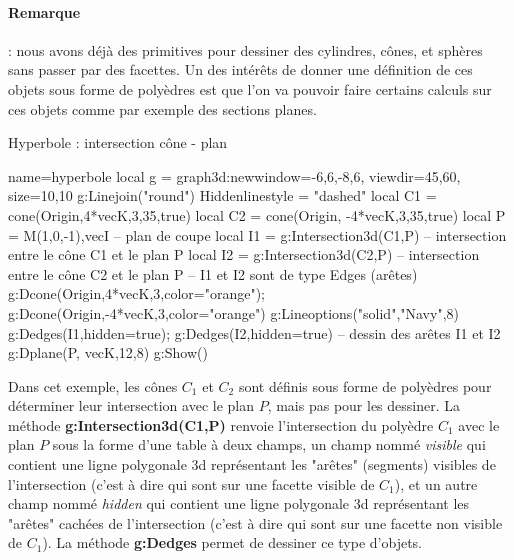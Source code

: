 \paragraph{Remarque} : nous avons déjà des primitives pour dessiner des cylindres, cônes, et sphères sans passer par des facettes. Un des intérêts de donner une définition de ces objets sous forme de polyèdres est que l'on va pouvoir faire certains calculs sur ces objets comme par exemple des sections planes.

\begin{demo}{Hyperbole : intersection cône - plan}
\begin{luadraw}{name=hyperbole}
local g = graph3d:new{window={-6,6,-8,6}, viewdir={45,60}, size={10,10}}
g:Linejoin("round")
Hiddenlinestyle = "dashed"
local C1 = cone(Origin,4*vecK,3,35,true)
local C2 = cone(Origin, -4*vecK,3,35,true)
local P = {M(1,0,-1),vecI} -- plan de coupe
local I1 = g:Intersection3d(C1,P) -- intersection entre le cône C1 et le plan P
local I2 = g:Intersection3d(C2,P) -- intersection entre le cône C2 et le plan P
-- I1 et I2 sont de type Edges (arêtes)
g:Dcone(Origin,4*vecK,3,{color="orange"}); g:Dcone(Origin,-4*vecK,3,{color="orange"})
g:Lineoptions("solid","Navy",8)
g:Dedges(I1,{hidden=true}); g:Dedges(I2,{hidden=true}) -- dessin des arêtes I1 et I2
g:Dplane(P, vecK,12,8)
g:Show()
\end{luadraw}
\end{demo}

Dans cet exemple, les cônes $C_1$ et $C_2$ sont définis sous forme de polyèdres pour déterminer leur intersection avec le plan $P$, mais pas pour les dessiner. La méthode \textbf{g:Intersection3d(C1,P)} renvoie l'intersection du polyèdre $C_1$ avec le plan $P$ sous la forme d'une table à deux champs, un champ nommé \emph{visible} qui contient une ligne polygonale 3d représentant les "arêtes" (segments) visibles de l'intersection (c'est à dire qui sont sur une facette visible de $C_1$), et un autre champ nommé \emph{hidden} qui contient une ligne polygonale 3d représentant les "arêtes" cachées de l'intersection (c'est à dire qui sont sur une facette non visible de $C_1$). La méthode \textbf{g:Dedges} permet de dessiner ce type d'objets.

